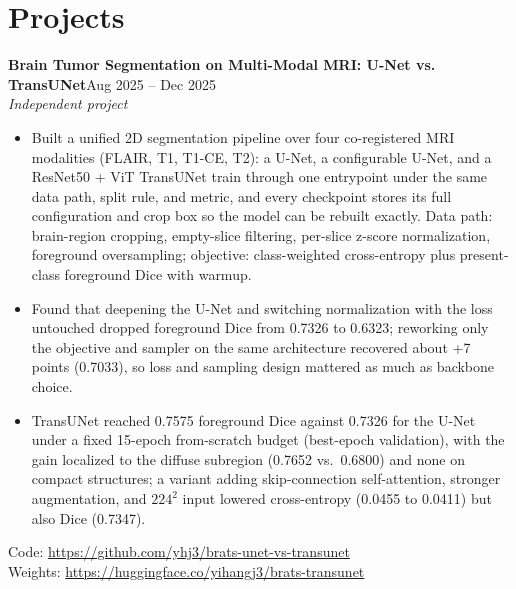 \documentclass[10pt,letterpaper]{article}
\newcommand{\entry}[3]{\noindent\textbf{#1}\hfill #2\\ \textit{#3}\vspace{1pt}}
\newcommand{\code}[1]{\small Code: \url{#1}}
\begin{document}
\section*{Projects}

\entry{Brain Tumor Segmentation on Multi-Modal MRI: U-Net vs. TransUNet}{Aug 2025 -- Dec 2025}{Independent project}
\begin{itemize}
\item Built a unified 2D segmentation pipeline over four co-registered MRI modalities (FLAIR, T1,
      T1-CE, T2): a U-Net, a configurable U-Net, and a ResNet50 + ViT TransUNet train through one
      entrypoint under the same data path, split rule, and metric, and every checkpoint stores its full
      configuration and crop box so the model can be rebuilt exactly. Data path: brain-region cropping,
      empty-slice filtering, per-slice z-score normalization, foreground oversampling; objective:
      class-weighted cross-entropy plus present-class foreground Dice with warmup.
\item Found that deepening the U-Net and switching normalization with the loss untouched dropped
      foreground Dice from 0.7326 to 0.6323; reworking only the objective and sampler on the same
      architecture recovered about +7 points (0.7033), so loss and sampling design mattered as much as
      backbone choice.
\item TransUNet reached 0.7575 foreground Dice against 0.7326 for the U-Net under a fixed 15-epoch
      from-scratch budget (best-epoch validation), with the gain localized to the diffuse subregion
      (0.7652 vs.\ 0.6800) and none on compact structures; a variant adding skip-connection
      self-attention, stronger augmentation, and $224^2$ input lowered cross-entropy (0.0455 to 0.0411)
      but also Dice (0.7347).
\end{itemize}
\code{https://github.com/yhj3/brats-unet-vs-transunet} \\
{\small Weights: \url{https://huggingface.co/yihangj3/brats-transunet}}
\end{document}

